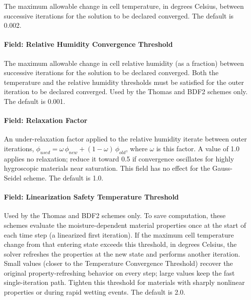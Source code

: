 The maximum allowable change in cell temperature, in degrees Celsius, between successive iterations for the solution to be declared converged. The default is 0.002.

\paragraph{Field: Relative Humidity Convergence Threshold}\label{field-relative-humidity-convergence-threshold-hamt}

The maximum allowable change in cell relative humidity (as a fraction) between successive iterations for the solution to be declared converged. Both the temperature and the relative humidity thresholds must be satisfied for the outer iteration to be declared converged. Used by the Thomas and BDF2 schemes only. The default is 0.001.

\paragraph{Field: Relaxation Factor}\label{field-relaxation-factor-hamt}

An under-relaxation factor applied to the relative humidity iterate between outer iterations, \(\phi_{used} = \omega \, \phi_{new} + (1 - \omega)\, \phi_{old}\), where \(\omega\) is this factor. A value of 1.0 applies no relaxation; reduce it toward 0.5 if convergence oscillates for highly hygroscopic materials near saturation. This field has no effect for the Gauss-Seidel scheme. The default is 1.0.

\paragraph{Field: Linearization Safety Temperature Threshold}\label{field-linearization-safety-temperature-threshold}

Used by the Thomas and BDF2 schemes only. To save computation, these schemes evaluate the moisture-dependent material properties once at the start of each time step (a linearized first iteration). If the maximum cell temperature change from that entering state exceeds this threshold, in degrees Celsius, the solver refreshes the properties at the new state and performs another iteration. Small values (closer to the Temperature Convergence Threshold) recover the original property-refreshing behavior on every step; large values keep the fast single-iteration path. Tighten this threshold for materials with sharply nonlinear properties or during rapid wetting events. The default is 2.0.

